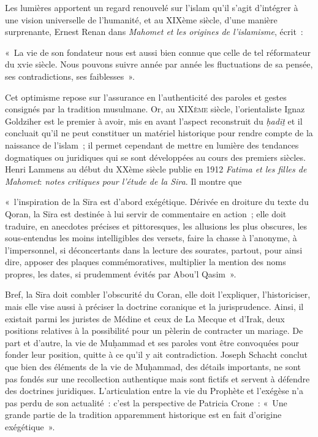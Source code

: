 Les lumières apportent un regard renouvelé sur l'islam qu'il s'agit
d'intégrer à une vision universelle de l'humanité, et au XIXème siècle,
d'une manière surprenante, Ernest Renan dans \emph{Mahomet et les
origines de l'islamisme}, écrit~:

«~La vie de son fondateur nous est aussi bien connue que celle de tel
réformateur du xvie siècle. Nous pouvons suivre année par année les
fluctuations de sa pensée, ses contradictions, ses faiblesses~».

Cet optimisme repose sur l'assurance en l'authenticité des paroles et
gestes consignés par la tradition musulmane. Or, au \textsc{XIXème}
siècle, l'orientaliste Ignaz Goldziher est le premier à avoir, mis en
avant l'aspect reconstruit du \emph{ḥadīṯ} et il concluait qu'il ne peut
constituer un matériel historique pour rendre compte de la naissance de
l'islam~; il permet cependant de mettre en lumière des tendances
dogmatiques ou juridiques qui se sont développées au cours des premiers
siècles. Henri Lammens au début du XXème siècle publie en 1912
\emph{Fatima et les filles de Mahomet}: \emph{notes critiques pour
l'étude de la Sira}. Il montre que

«~l'inspiration de la Sīra est d'abord exégétique. Dérivée en droiture
du texte du Qoran, la Sīra est destinée à lui servir de commentaire en
action~; elle doit traduire, en anecdotes précises et pittoresques, les
allusions les plus obscures, les sous-entendus les moins intelligibles
des versets, faire la chasse à l'anonyme, à l'impersonnel, si
déconcertants dans la lecture des sourates, partout, pour ainsi dire,
apposer des plaques commémoratives, multiplier la mention des noms
propres, les dates, si prudemment évités par Abou'l Qasim~».

Bref, la Sīra doit combler l'obscurité du Coran, elle doit l'expliquer,
l'historiciser, mais elle vise aussi à préciser la doctrine coranique et
la jurisprudence. Ainsi, il existait parmi les juristes de Médine et
ceux de La Mecque et d'Irak, deux positions relatives à la possibilité
pour un pèlerin de contracter un mariage. De part et d'autre, la vie de
Muḥammad et ses paroles vont être convoquées pour fonder leur position,
quitte à ce qu'il y ait contradiction. Joseph Schacht conclut que bien
des éléments de la vie de Muḥammad, des détails importants, ne sont pas
fondés sur une recollection authentique mais sont fictifs et servent à
défendre des doctrines juridiques. L'articulation entre la vie du
Prophète et l'exégèse n'a pas perdu de son actualité~: c'est la
perspective de Patricia Crone~: «~Une grande partie de la tradition
apparemment historique est en fait d'origine exégétique~».

